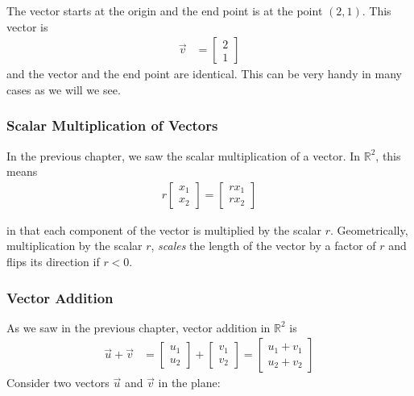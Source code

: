 The vector starts at the origin and the end point is at the point $(2,1)$.  This vector is 
%
\begin{align*} \vec{v} & = 
\begin{bmatrix}
2 \\1
\end{bmatrix}
\end{align*}
and the vector and the end point are identical.  This can be very handy in many cases as we will we see.  



\subsubsection{Scalar Multiplication of Vectors}

In the previous chapter, we saw the scalar multiplication of a vector.  In $\mathbb{R}^2$, this means 
%
\begin{align*}
r \begin{bmatrix}
x_1 \\ x_2
\end{bmatrix} = \begin{bmatrix}
r x_1 \\ r x_2 
\end{bmatrix}
\end{align*}

 
in that each component of the vector is multiplied by the scalar $r$.  Geometrically, multiplication by the scalar $r$, \emph{scales} the length of the vector by a factor of $r$ and flips its direction if $r<0$.  

\begin{center}
\end{center}

\subsubsection{Vector Addition}

As we saw in the previous chapter, vector addition in $\mathbb{R}^2$ is
%
\begin{align*}
\vec{u} + \vec{v} & = \begin{bmatrix}
u_1 \\ u_2 
\end{bmatrix} + \begin{bmatrix}
v_1 \\ v_2 
\end{bmatrix} = \begin{bmatrix}
u_1 + v_1 \\ u_2 + v_2 
\end{bmatrix}
\end{align*}
Consider two vectors $\vec{u}$ and $\vec{v}$ in the plane:

